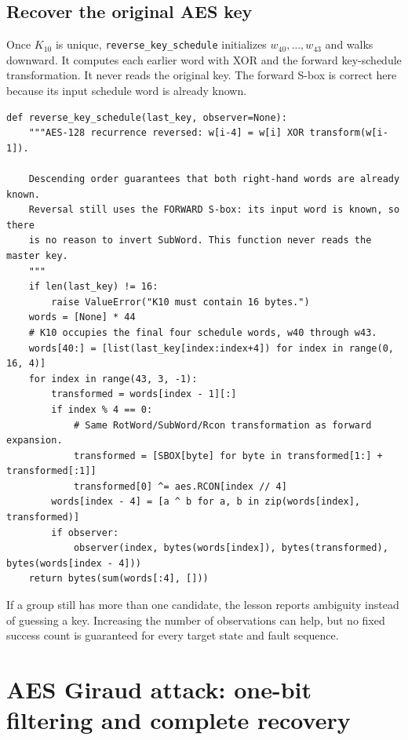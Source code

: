 \documentclass[11pt,a4paper]{report}
\begin{document}
\subsection{Recover the original AES key}
Once $K_{10}$ is unique, \texttt{reverse\_key\_schedule} initializes $w_{40},\ldots,w_{43}$ and walks downward. It computes each earlier word with XOR and the forward key-schedule transformation. It never reads the original key. The forward S-box is correct here because its input schedule word is already known.
\begin{lstlisting}[style=pycode,caption={Reverse AES-128 expansion to recover the original key}]
def reverse_key_schedule(last_key, observer=None):
    """AES-128 recurrence reversed: w[i-4] = w[i] XOR transform(w[i-1]).

    Descending order guarantees that both right-hand words are already known.
    Reversal still uses the FORWARD S-box: its input word is known, so there
    is no reason to invert SubWord. This function never reads the master key.
    """
    if len(last_key) != 16:
        raise ValueError("K10 must contain 16 bytes.")
    words = [None] * 44
    # K10 occupies the final four schedule words, w40 through w43.
    words[40:] = [list(last_key[index:index+4]) for index in range(0, 16, 4)]
    for index in range(43, 3, -1):
        transformed = words[index - 1][:]
        if index % 4 == 0:
            # Same RotWord/SubWord/Rcon transformation as forward expansion.
            transformed = [SBOX[byte] for byte in transformed[1:] + transformed[:1]]
            transformed[0] ^= aes.RCON[index // 4]
        words[index - 4] = [a ^ b for a, b in zip(words[index], transformed)]
        if observer:
            observer(index, bytes(words[index]), bytes(transformed), bytes(words[index - 4]))
    return bytes(sum(words[:4], []))
\end{lstlisting}

If a group still has more than one candidate, the lesson reports ambiguity instead of guessing a key. Increasing the number of observations can help, but no fixed success count is guaranteed for every target state and fault sequence.

\section{AES Giraud attack: one-bit filtering and complete recovery}
\end{document}
